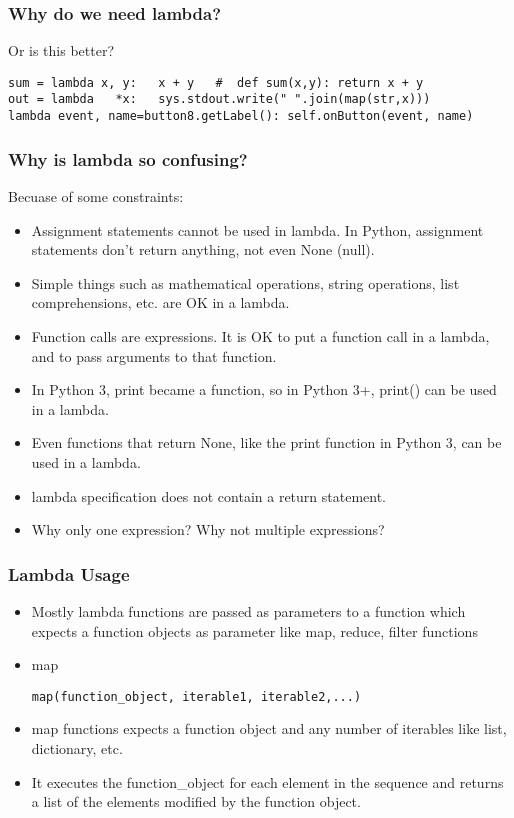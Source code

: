 \begin{frame}[fragile]\frametitle{Why do we need lambda?}

Or is this better?
        \begin{lstlisting}
sum = lambda x, y:   x + y   #  def sum(x,y): return x + y
out = lambda   *x:   sys.stdout.write(" ".join(map(str,x)))
lambda event, name=button8.getLabel(): self.onButton(event, name)
\end{lstlisting}

\end{frame}

\begin{frame}[fragile]\frametitle{Why is lambda so confusing?}
Becuase of some constraints:
    \begin{itemize}
    \item  Assignment statements cannot be used in lambda. In Python, assignment statements don't return anything, not even None (null).
    \item Simple things such as mathematical operations, string operations, list comprehensions, etc. are OK in a lambda.
    \item Function calls are expressions. It is OK to put a function call in a lambda, and to pass arguments to that function. 
    \item In Python 3, print became a function, so in Python 3+, print() can be used in a lambda.
\item Even functions that return None, like the print function in Python 3, can be used in a lambda.
    \item   lambda specification does not contain a return statement.
    \item Why only one expression? Why not multiple expressions? 
    \end{itemize}

\end{frame}


\begin{frame}[fragile]\frametitle{Lambda Usage}

    \begin{itemize}
    \item  Mostly lambda functions are passed as parameters to a function which expects a function objects as parameter like map, reduce, filter functions
	\item map
	    \begin{lstlisting}
map(function_object, iterable1, iterable2,...)
\end{lstlisting}
\item map functions expects a function object and any number of iterables like list, dictionary, etc.
\item It executes the function\_object for each element in the sequence and returns a list of the elements modified by the function object.
    \end{itemize}

\end{frame}

